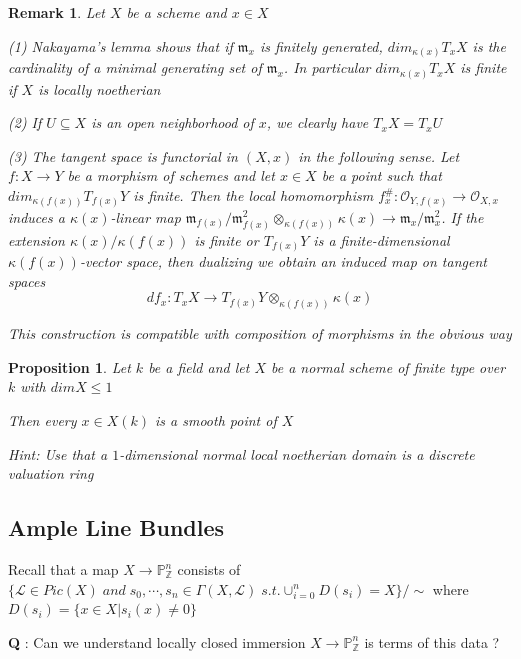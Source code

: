 \documentclass{article}
\newtheorem{proposition}[theorem]{Proposition}
\newtheorem{remark}[theorem]{Remark}
\begin{document}
\begin{remark}
    Let $X$ be a scheme and $x \in X$
    
(1) Nakayama’s lemma shows that if $\mathfrak m_x$ is finitely generated, $dim_{\kappa(x)} T_xX$ is the cardinality of a minimal generating set of $\mathfrak m_x$. In particular $dim_{\kappa(x)} T_xX$ is finite if $X$ is
locally noetherian

(2)  If $U \subseteq X$ is an open neighborhood of $x$, we clearly have $T_xX = T_xU$

(3)  The tangent space is functorial in $(X, x)$ in the following sense. Let $f : X \to Y$ be
a morphism of schemes and let $x \in X$ be a point such that $dim_{\kappa(f(x))} T_{f(x)}Y$ is
finite. Then the local homomorphism $f_x^\# :\mathcal O_{Y,f(x)} \to \mathcal O_{X,x}$ induces a $\kappa(x)$-linear map
$\mathfrak m_{f(x)}/\mathfrak m^2_
{f(x)} \otimes _{\kappa(f(x))} \kappa(x) \to \mathfrak m_x/\mathfrak m^2_
x$. If the extension $\kappa(x)/\kappa(f(x))$ is finite or $T_{f(x)}Y$
is a finite-dimensional $\kappa(f(x))$-vector space, then dualizing we obtain an induced
map on tangent spaces
$$
df_x : T_xX \to T_{f(x)}Y \otimes _{\kappa(f(x))} \kappa(x)
$$

This construction is compatible with composition of morphisms in the obvious way
\end{remark}

\begin{proposition}
    Let $k$ be a field and let $X$ be a normal scheme of finite type over $k$ with $dim X \leq 1$
    
Then every $x \in X(k)$ is a smooth point of $X$

Hint: Use that a $1$-dimensional normal local noetherian domain is a discrete valuation ring
\end{proposition}





\newpage
\subsection{Ample Line Bundles}

Recall that a map $X\to\mathbb P_{\mathbb Z}^n$ consists of $\{\mathcal L \in Pic(X)\;and\;s_0,\cdots,s_n \in \Gamma(X,\mathcal L)\;s.t.\cup_{i=0}^nD(s_i)=X\}/\sim$ where $D(s_i)=\{x\in X|s_i(x)\ne 0 \}$

\textbf{Q} : Can we understand locally closed immersion $X\to \mathbb P_{\mathbb Z}^n$ is terms of this data ?
\end{document}
